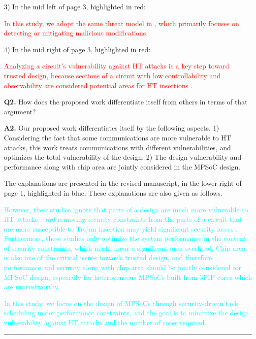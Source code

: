 \documentclass[10pt,journal, compsoc]{IEEEtran}
\begin{document}
\vspace{0.5em}

3) In the mid left of page 3, highlighted in red:

\textcolor{red}{In this study, we adopt the same threat model in \cite{article:CL, article:YS}, which primarily focuses on detecting or mitigating malicious modifications.}

\vspace{0.5em}

4) In the mid right of page 3, highlighted in red:

\textcolor{red}{Analyzing a circuit's vulnerability against HT attacks is a key step toward trusted design, because sections of a circuit with low controllability and observability are considered potential areas for HT insertions \cite{article:JC,article:YD}.}

\vspace*{1em}

\textbf{Q2.} How does the proposed work differentiate itself from others in terms of that argument?

\vspace*{1em}

\textbf{A2.} Our proposed work differentiates itself by the following aspects. 1) Considering the fact that some communications are more vulnerable to HT attacks, this work treats communications with different vulnerabilities, and optimizes the total vulnerability of the design. 2) The design vulnerability and  performance along with chip area are jointly considered in the MPSoC design.

The explanations are presented in the revised manuscript, in the lower right of page 1, highlighted in blue. These explanations are also given as follows.

\textcolor{cyan}{However, their studies ignore that parts of a design are much more vulnerable to HT attacks \cite{conference:HS}, and removing security constraints from the parts of a circuit that are more susceptible to Trojan insertion may yield significant security losses \cite{article:XC}. Furthermore, these studies only optimize the system performance in the context of security constraints, which might incur a significant area overhead. Chip area is also one of the critical issues towards trusted design, and therefore, performance and security along with chip area should be jointly considered for MPSoC design, especially for heterogeneous MPSoCs built from 3PIP cores which are untrustworthy.}

\textcolor{cyan}{In this study, we focus on the design of MPSoCs through security-driven task scheduling under performance constraints, and the goal is to minimize the design vulnerability against HT attacks and the number of cores required.}

\noindent\rule[0.25\baselineskip]{252pt}{1pt}
\end{document}
